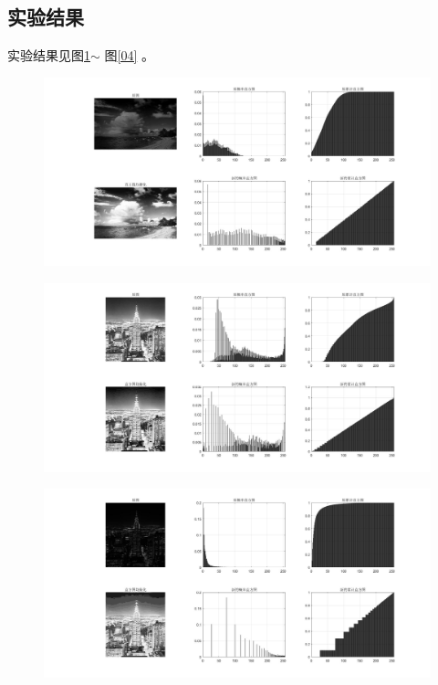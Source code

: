 \documentclass[12pt]{article}
\begin{document}
\subsection{实验结果}
实验结果见图\ref{01}$\sim$
图\ref{04}
。
\begin{figure}[htbp]
  \centering
  \includegraphics[width=\textwidth]{picture/01}
  \caption{}\label{01}
\end{figure}
\begin{figure}[htbp]
  \centering
  \includegraphics[width=\textwidth]{picture/02}
  \caption{}\label{02}
\end{figure}
\begin{figure}[htbp]
  \centering
  \includegraphics[width=\textwidth]{picture/03}
  \caption{}\label{03}
\end{figure}
\end{document}
